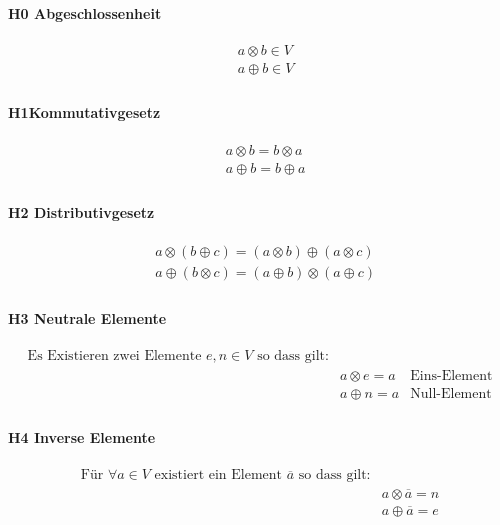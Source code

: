 \documentclass[a4paper]{scrartcl}
\begin{document}
				\paragraph{H0 Abgeschlossenheit}
				\begin{align*}
					&a \otimes b \in V\\
					&a \oplus b \in V\\
				\end{align*}
				
				\paragraph{H1Kommutativgesetz}
				\begin{align*}
					&a \otimes b = b \otimes a\\
					&a \oplus b = b \oplus a \\
				\end{align*}
				
				\paragraph{H2 Distributivgesetz}
				\begin{align*}
					& a \otimes (b \oplus c) = (a \otimes b) \oplus (a \otimes c)\\
					& a \oplus (b \otimes c) = (a \oplus b) \otimes (a \oplus c)\\
				\end{align*}
				
				\paragraph{H3 Neutrale Elemente}
				\begin{align*}
					\text{Es Existieren zwei Elemente } e,n \in V \text{ so dass gilt:}&\\
					&a \otimes e = a & \text{Eins-Element}\\
					&a \oplus n = a &\text{Null-Element}\\
				\end{align*}
				
				\paragraph{H4 Inverse Elemente}
				\begin{align*}
					\text{Für } \forall a \in V \text{ existiert ein Element } \overline{a} \text{ so dass gilt:}&\\
					&a \otimes \overline{a} = n \\
					&a \oplus \overline{a} = e\\
				\end{align*}
				
\end{document}
